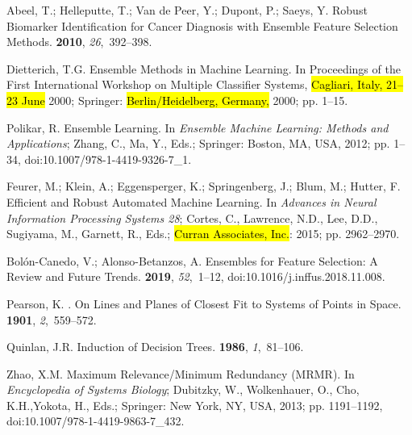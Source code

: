 \documentclass[remotesensing,article,accept,moreauthors,pdftex]{Definitions/mdpi}
\begin{document}
\begin{thebibliography}{999}
Abeel, T.; Helleputte, T.; {Van de Peer}, Y.; Dupont, P.; Saeys, Y.
\newblock Robust Biomarker Identification for Cancer Diagnosis with Ensemble
  Feature Selection Methods.
 {\bf 2010}, {\em 26},~392--398.

Dietterich, T.G.
\newblock Ensemble {{Methods}} in {{Machine Learning}}.
\newblock  In Proceedings of the {{First International Workshop}} on {{Multiple
  Classifier Systems}}, \hl{Cagliari, Italy, 21--23 June} 2000; {Springer}:  \hl{Berlin/Heidelberg, Germany,} %
 2000; pp. 1--15.

Polikar, R.
\newblock Ensemble {{Learning}}. In {\em Ensemble {{Machine Learning}}: Methods
  and {{Applications}}}; Zhang, C., Ma, Y., Eds.; {Springer}: {Boston, MA, USA},
  2012; pp. 1--34, doi:10.1007/978-1-4419-9326-7\_1.

Feurer, M.; Klein, A.; Eggensperger, K.; Springenberg, J.; Blum, M.; Hutter, F.
\newblock Efficient and {{Robust Automated Machine Learning}}. In {\em Advances
  in {{Neural Information Processing Systems}} 28}; Cortes, C., Lawrence, N.D.,
  Lee, D.D., Sugiyama, M., Garnett, R., Eds.; {\hl{Curran Associates, Inc.}}:  2015;
  pp. 2962--2970.

{Bol{\'o}n-Canedo}, V.; {Alonso-Betanzos}, A.
\newblock Ensembles for Feature Selection: A Review and Future Trends.
 {\bf 2019}, {\em 52},~1--12, doi:10.1016/j.inffus.2018.11.008.

Pearson, K.
. {{On}} Lines and Planes of Closest Fit to Systems of Points
  in Space.
 {\bf 1901}, {\em 2},~559--572.

Quinlan, J.R.
\newblock Induction of Decision Trees.
 {\bf 1986}, {\em 1},~81--106.

Zhao, X.M.
\newblock Maximum {{Relevance}}/{{Minimum Redundancy}} ({{MRMR}}). In {\em
  Encyclopedia of {{Systems Biology}}}; Dubitzky, W., Wolkenhauer, O., Cho,
  K.H.,Yokota, H., Eds.; {Springer}: {New York, NY, USA},  2013; pp.
  1191--1192, doi:10.1007/978-1-4419-9863-7\_432.


\end{thebibliography}
\end{document}
